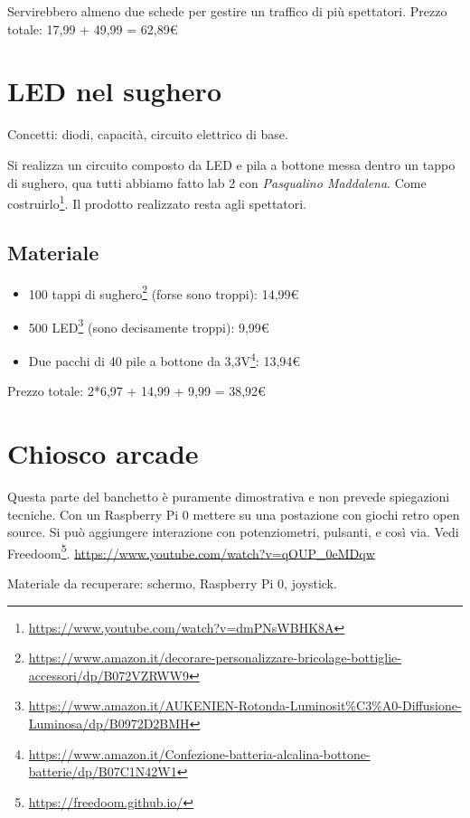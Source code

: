 \documentclass[a4paper]{article}
\begin{document}
Servirebbero almeno due schede per gestire un traffico di più spettatori. Prezzo
totale: 17,99 + 49,99 = 62,89€

\section{LED nel sughero}%
\label{sec:sughero}

Concetti: diodi, capacità, circuito elettrico di base.

Si realizza un circuito composto da LED e pila a bottone messa dentro un tappo
di sughero, qua tutti abbiamo fatto lab 2 con \emph{Pasqualino Maddalena}. Come
costruirlo\footnote{ \url{https://www.youtube.com/watch?v=dmPNsWBHK8A} }. Il
prodotto realizzato resta agli spettatori.

\subsection{Materiale}%
\label{subsec:sughero-materiale}

\begin{itemize}
  \item 100 tappi di sughero\footnote{
        \url{https://www.amazon.it/decorare-personalizzare-bricolage-bottiglie-accessori/dp/B072VZRWW9}
        } (forse sono troppi): 14,99€
  \item 500 LED\footnote{
        \url{https://www.amazon.it/AUKENIEN-Rotonda-Luminosit\%C3\%A0-Diffusione-Luminosa/dp/B0972D2BMH}
        } (sono decisamente troppi): 9,99€
  \item Due pacchi di 40 pile a bottone da 3,3V\footnote{
        \url{https://www.amazon.it/Confezione-batteria-alcalina-bottone-batterie/dp/B07C1N42W1}
        }: 13,94€
\end{itemize}

Prezzo totale: 2*6,97 + 14,99 + 9,99 = 38,92€

\section{Chiosco arcade}%
\label{sec:arcade}

Questa parte del banchetto è puramente dimostrativa e non prevede spiegazioni
tecniche. Con un Raspberry Pi 0 mettere su una postazione con giochi retro open
source. Si può aggiungere interazione con potenziometri, pulsanti, e così via.
Vedi Freedoom\footnote{ \url{https://freedoom.github.io/} }.
\url{https://www.youtube.com/watch?v=qOUP_0eMDqw}

Materiale da recuperare: schermo, Raspberry Pi 0, joystick.
\end{document}
